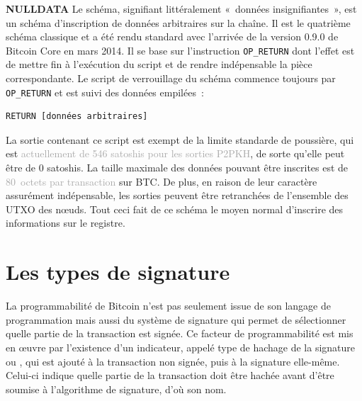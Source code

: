\textbf{NULLDATA} Le schéma, signifiant littéralement «~données insignifiantes~», est un schéma d'inscription de données arbitraires sur la chaîne. Il est le quatrième schéma classique et a été rendu standard avec l'arrivée de la version 0.9.0 de Bitcoin Core en mars 2014. Il se base sur l'instruction \texttt{OP\_RETURN} dont l'effet est de mettre fin à l'exécution du script et de rendre indépensable la pièce correspondante. Le script de verrouillage du schéma commence toujours par \texttt{OP\_RETURN} et est suivi des données empilées~:

\begin{Verbatim}[fontsize=\footnotesize]
RETURN [données arbitraires]
\end{Verbatim}

La sortie contenant ce script est exempt de la limite standarde de poussière, qui est \textcolor{darkgray}{actuellement de 546 satoshis pour les sorties P2PKH}, de sorte qu'elle peut être de 0 satoshis. La taille maximale des données pouvant être inscrites est de \textcolor{darkgray}{80~octets par transaction} sur BTC. De plus, en raison de leur caractère assurément indépensable, les sorties peuvent être retranchées de l'ensemble des UTXO des nœuds. Tout ceci fait de ce schéma le moyen normal d'inscrire des informations sur le registre.

\section*{Les types de signature}


La programmabilité de Bitcoin n'est pas seulement issue de son langage de programmation mais aussi du système de signature qui permet de sélectionner quelle partie de la transaction est signée. Ce facteur de programmabilité est mis en œuvre par l'existence d'un indicateur, appelé type de hachage de la signature ou , qui est ajouté à la transaction non signée, puis à la signature elle-même. Celui-ci indique quelle partie de la transaction doit être hachée avant d'être soumise à l'algorithme de signature, d'où son nom.

